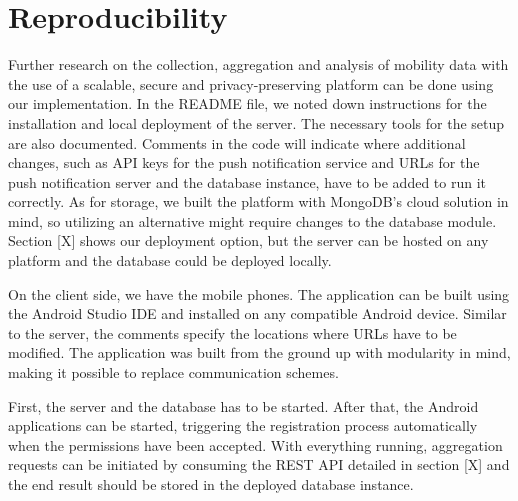 \section{Reproducibility}
Further research on the collection, aggregation and analysis of mobility data with the use of a scalable, secure and privacy-preserving platform can be done using our implementation. In the README file, we noted down instructions for the installation and local deployment of the server. The necessary tools for the setup are also documented. Comments in the code will indicate where additional changes, such as API keys for the push notification service and URLs for the push notification server and the database instance, have to be added to run it correctly. As for storage, we built the platform with MongoDB's cloud solution in mind, so utilizing an alternative might require changes to the database module. Section [X] shows our deployment option, but the server can be hosted on any platform and the database could be deployed locally.

On the client side, we have the mobile phones. The application can be built using the Android Studio IDE and installed on any compatible Android device. Similar to the server, the comments specify the locations where URLs have to be modified. The application was built from the ground up with modularity in mind, making it possible to replace communication schemes.

First, the server and the database has to be started. After that, the Android applications can be started, triggering the registration process automatically when the permissions have been accepted. With everything running, aggregation requests can be initiated by consuming the REST API detailed in section [X] and the end result should be stored in the deployed database instance.